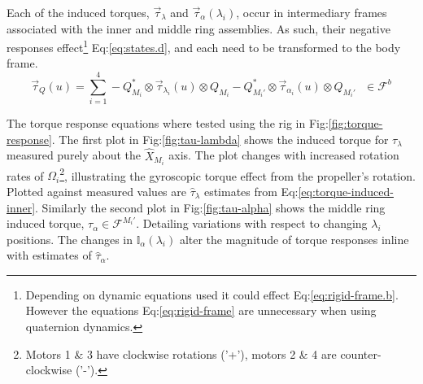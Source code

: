 Each of the induced torques, $\vec{\tau}_\lambda$ and $\vec{\tau}_\alpha(\lambda_i)$, occur in intermediary frames associated with the inner and middle ring assemblies. As such, their negative responses effect\footnote{Depending on dynamic equations used it could  effect Eq:\ref{eq:rigid-frame.b}. However the equations Eq:\ref{eq:rigid-frame} are unnecessary when using quaternion dynamics.} Eq:\ref{eq:states.d}, and each need to be transformed to the body frame.
\begin{equation}\label{eq:torque-response}
\vec{\tau}_Q(u)=\sum_{i=1}^4 -Q_{M_i}^*\otimes \vec{\tau}_{\lambda_i}(u)\otimes Q_{M_i}-Q_{M_i'}^*\otimes \vec{\tau}_{\alpha_i}(u) \otimes Q_{M_i'}~~~\in\mathcal{F}^b
\end{equation}
\par
The torque response equations where tested using the rig in Fig:\ref{fig:torque-response}. The first plot in Fig:\ref{fig:tau-lambda} shows the induced torque for $\tau_\lambda$ measured purely about the $\hat{X}_{M_i}$ axis. The plot changes with increased rotation rates of $\Omega_i$\footnote{Motors 1 \& 3 have clockwise rotations ('+'), motors 2 \& 4 are counter-clockwise ('-').}, illustrating the gyroscopic torque effect from the propeller's rotation. Plotted against measured values are $\hat{\tau}_\lambda$ estimates from Eq:\ref{eq:torque-induced-inner}. Similarly the second plot in Fig:\ref{fig:tau-alpha} shows the middle ring induced torque, $\tau_\alpha\in\mathcal{F}^{M_i'}$. Detailing variations with respect to changing $\lambda_i$ positions. The changes in $\mathbb{I}_\alpha(\lambda_i)$ alter the magnitude of torque responses inline with estimates of $\hat{\tau}_\alpha$.

